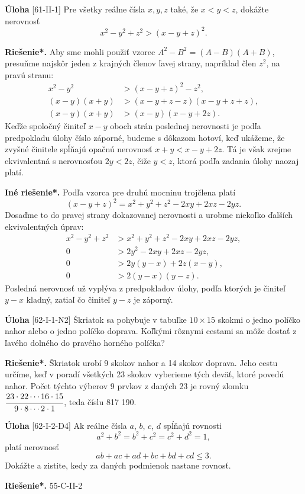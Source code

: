 \documentclass{article}
\newcommand{\rieh}{\textbf{Riešenie*.} }
\newcommand{\problem}[4]{
  \begin{tcolorbox}[breakable,notitle,boxrule=0pt,colback=light-gray,colframe=light-gray]
    \textbf{Úloha}
    [#1] #3
  \end{tcolorbox}
  \noindent#4
}
\begin{document}
\problem{61-II-1}{}{
Pre všetky reálne čísla $x, y, z$ také, že $x < y < z$, dokážte nerovnosť $$x^2 - y^2 + z^2> (x - y + z)^2.$$
}{
\rieh Aby sme mohli použiť vzorec $A^2 - B^2 = (A - B)(A + B)$, presuňme najskôr jeden z krajných členov ľavej strany, napríklad člen $z^2$, na pravú stranu:
\begin{align*}
x^2 - y^2 & > (x - y + z)^2-z^2,\\
(x - y)(x + y) & > (x - y + z - z)(x - y + z + z),\\
(x - y)(x + y) & > (x - y)(x - y + 2z).
\end{align*}
Keďže spoločný činiteľ $x - y$ oboch strán poslednej nerovnosti je podľa predpokladu úlohy číslo záporné, budeme s dôkazom hotoví, keď ukážeme, že zvyšné činitele spĺňajú opačnú nerovnosť $x + y < x - y + 2z$. Tá je však zrejme ekvivalentná s nerovnosťou $2y < 2z$, čiže $y < z$, ktorá podľa zadania úlohy naozaj platí.

\textbf{Iné riešenie*.} Podľa vzorca pre druhú mocninu trojčlena platí $$(x - y + z)^2= x^2+ y^2+ z^2 - 2xy + 2xz - 2yz.$$
Dosaďme to do pravej strany dokazovanej nerovnosti a urobme niekoľko ďalších ekvivalentných úprav:
\begin{align*}
x^2 - y^2+ z^2 &> x^2+ y^2+ z^2 - 2xy + 2xz - 2yz,\\
0 &> 2y^2 - 2xy + 2xz - 2yz,\\
0 &>  2y(y - x) + 2z(x - y),\\
0 &> 2(y - x)(y - z).
\end{align*}
Posledná nerovnosť už vyplýva z predpokladov úlohy, podľa ktorých je činiteľ $y - x$ kladný, zatiaľ čo činiteľ $y - z$ je záporný.
}


\problem{62-I-1-N2}{}{
Škriatok sa pohybuje v tabuľke $10 \times 15$ skokmi o jedno políčko nahor alebo o jedno políčko doprava. Koľkými rôznymi cestami sa môže dostať z ľavého dolného do pravého horného políčka?
}{
\rieh Škriatok urobí 9 skokov nahor a 14 skokov doprava. Jeho cestu určíme, keď v poradí všetkých 23 skokov vyberieme tých deväť, ktoré povedú nahor. Počet týchto výberov 9 prvkov z daných 23 je rovný zlomku $\cfrac{23\cdot 22 \cdots 16\cdot 15}{9 \cdot 8 \cdots 2 \cdot 1}$, teda číslu 817 190.
}


\problem{62-I-2-D4}{}{
Ak reálne čísla $a$, $b$, $c$, $d$ spĺňajú rovnosti
$$a^2+ b^2= b^2+ c^2= c^2+ d^2= 1,$$
platí nerovnosť
$$ab + ac + ad + bc + bd + cd \leq 3.$$
Dokážte a zistite, kedy za daných podmienok nastane rovnosť.
}{
\rieh 55-C-II-2
}
\end{document}

